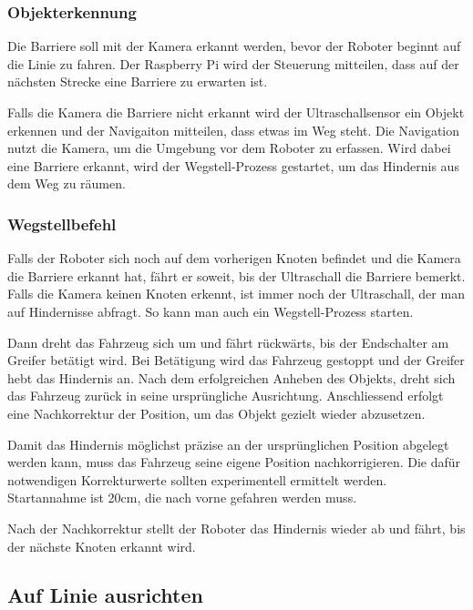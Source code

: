 \subsubsection{Objekterkennung}

Die Barriere soll mit der Kamera erkannt werden, bevor der Roboter beginnt auf die Linie zu fahren. Der Raspberry Pi wird der Steuerung mitteilen, dass auf der nächsten Strecke eine Barriere zu erwarten ist.

Falls die Kamera die Barriere nicht erkannt wird der Ultraschallsensor ein Objekt erkennen und der Navigaiton mitteilen, dass etwas im Weg steht. Die Navigation nutzt die Kamera, um die Umgebung vor dem Roboter zu erfassen. Wird dabei eine Barriere erkannt, wird der Wegstell-Prozess gestartet, um das Hindernis aus dem Weg zu räumen.

\subsubsection{Wegstellbefehl}

Falls der Roboter sich noch auf dem vorherigen Knoten befindet und die Kamera die Barriere erkannt hat, fährt er soweit, bis der Ultraschall die Barriere bemerkt. Falls die Kamera keinen Knoten erkennt, ist immer noch der Ultraschall, der man auf Hindernisse abfragt. So kann man auch ein Wegstell-Prozess starten.

Dann dreht das Fahrzeug sich um und fährt rückwärts, bis der Endschalter am Greifer betätigt wird. Bei Betätigung wird das Fahrzeug gestoppt und der Greifer hebt das Hindernis an.
Nach dem erfolgreichen Anheben des Objekts, dreht sich das Fahrzeug zurück in seine ursprüngliche Ausrichtung. Anschliessend erfolgt eine Nachkorrektur der Position, um das Objekt gezielt wieder abzusetzen.

Damit das Hindernis möglichst präzise an der ursprünglichen Position abgelegt werden kann, muss das Fahrzeug seine eigene Position nachkorrigieren. Die dafür notwendigen Korrekturwerte sollten experimentell ermittelt werden. Startannahme ist 20cm, die nach vorne gefahren werden muss.

Nach der Nachkorrektur stellt der Roboter das Hindernis wieder ab und fährt, bis der nächste Knoten erkannt wird.


\newpage
\subsection{Auf Linie ausrichten}

